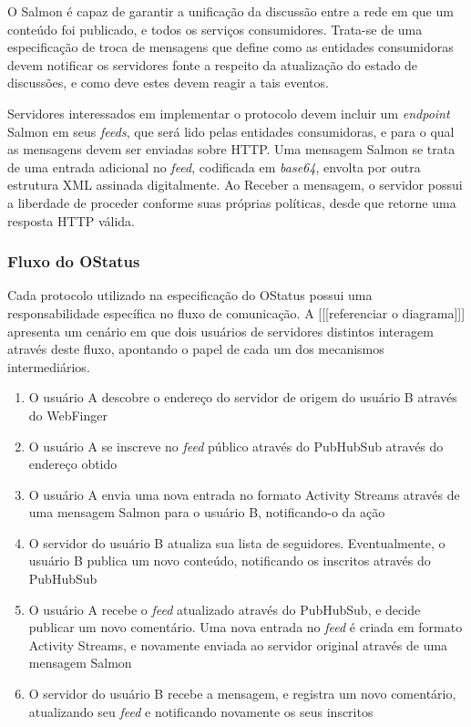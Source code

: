 O Salmon é capaz de garantir a unificação da discussão entre a rede em que um
conteúdo foi publicado, e todos os serviços consumidores. Trata-se de uma
especificação de troca de mensagens que define como as entidades consumidoras devem
notificar os servidores fonte a respeito da atualização do estado de discussões, e
como deve estes devem reagir a tais eventos.

Servidores interessados em implementar o protocolo devem incluir um \textit{endpoint}
Salmon em seus \textit{feeds}, que será lido pelas entidades consumidoras, e para o
qual as mensagens devem ser enviadas sobre HTTP. Uma mensagem Salmon se trata de uma
entrada adicional no \textit{feed}, codificada em \textit{base64}, envolta por outra
estrutura XML assinada digitalmente. Ao Receber a mensagem, o servidor possui a
liberdade de proceder conforme suas próprias políticas, desde que retorne uma
resposta HTTP válida.

\subsubsection{Fluxo do OStatus}

Cada protocolo utilizado na especificação do OStatus possui uma responsabilidade
específica no fluxo de comunicação. A [[[referenciar o diagrama]]] apresenta um
cenário em que dois usuários de servidores distintos interagem através deste fluxo,
apontando o papel de cada um dos mecanismos intermediários.


\begin{enumerate}
  \item{O usuário A descobre o endereço do servidor de origem do usuário B através
        do WebFinger}
  \item{O usuário A se inscreve no \textit{feed} público através do PubHubSub
        através do endereço obtido}
  \item{O usuário A envia uma nova entrada no formato Activity Streams através de
        uma mensagem Salmon para o usuário B, notificando-o da ação}
  \item{O servidor do usuário B atualiza sua lista de seguidores. Eventualmente, o
        usuário B publica um novo conteúdo, notificando os inscritos através do
        PubHubSub}
  \item{O usuário A recebe o \textit{feed} atualizado através do PubHubSub, e decide
        publicar um novo comentário. Uma nova entrada no \textit{feed} é criada em
        formato Activity Streams, e novamente enviada ao servidor original através
        de uma mensagem Salmon}
  \item{O servidor do usuário B recebe a mensagem, e registra um novo comentário,
        atualizando seu \textit{feed} e notificando novamente os seus inscritos}
\end{enumerate}


